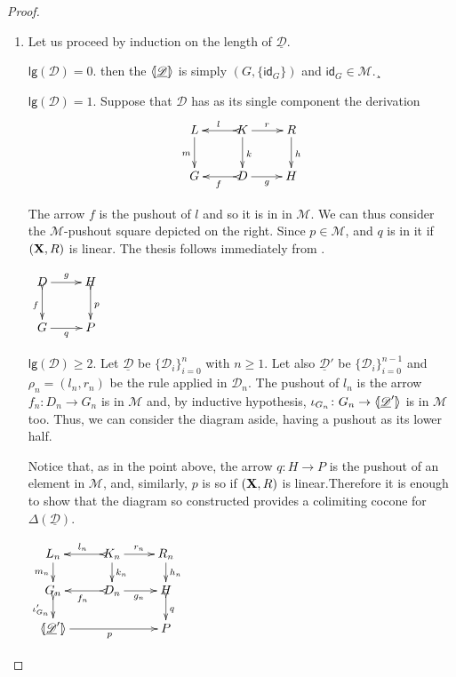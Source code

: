 \documentclass[a4paper,UKenglish,cleveref,pdftex,thm-restate,numberwithinsect]{lipics-v2021}
\newcommand{\id}[1]{\mathsf{id}_{#1}}
\def\R{\mathsf{R}}
\def\X{\textbf {\textup{X}}}
\def\G{\textbf {\textup{G}}}
\newcommand{\dder}[1]{\mathscr{#1}}
\newcommand{\der}[1]{\underline{\dder{#1}}}
\newcommand{\lpro}{\langle \hspace{-1.85pt}[}
\newcommand{\rpro}{]\hspace{-1.85pt}\rangle}
\newcommand{\tpro}[1]{\lpro \der{#1}\rpro}
\newcommand{\lgh}[0]{\mathsf{lg}}
\begin{document}
\begin{proof}
	\begin{enumerate}
		\item Let us proceed by induction on the length of $\der{D}$.
		
		
		\smallskip \noindent
		$\lgh(\dder{D})=0$. then the
		$\tpro{\dder{D}}$ is simply $(G, \{\id{G}\})$ and
		$\id{G}\in \mathcal{M}$.¸
		
		\smallskip \noindent
		$\lgh(\dder{D})=1$. Suppose that $\dder{D}$
		has as its single component the derivation
		\[\xymatrix{L \ar[d]_{m}& K \ar[d]^{k}\ar@{>->}[l]_{l} \ar[r]^{r} & R \ar[d]^{h} \\G& \ar@{>->}[l]^{f} D \ar[r]_{g}& H  \\}\]
	
		\parbox{11cm}{The arrow $f$ is  the pushout of $l$ and so it is in in $\mathcal{M}$. We can thus consider the $\mathcal{M}$-pushout square depicted on the right.
		Since $p\in \mathcal{M}$, and $q$ is in it if $(\X, \R)$ is linear. The thesis follows immediately from .}
		\parbox{2cm}{
			$\xymatrix{D \ar@{>->}[d]_{f} \ar[r]^{g} & H \ar@{>->}[d]^{p} \\G \ar[r]_{q}& P }$}
		
		\smallskip \noindent
	\parbox{9cm}{$\lgh(\dder{D})\geq 2$. Let $\der{D}$ be
		$\{\dder{D}_i\}_{i=0}^n$ with $n\geq 1$. Let also $\der{D}'$ be
		$\{\dder{D}_i\}^{n-1}_{i=0}$ and $\rho_n=(l_n, r_n)$ be the rule
		applied in $\dder{D}_n$. The pushout of $l_n$ is the arrow
		$f_n\colon D_n\to G_n$ is in $\mathcal{M}$ and, by inductive
		hypothesis, $\iota_{G_{n}}\colon G_{n}\to \lpro \der{D}'\rpro$ is
		in $\mathcal{M}$ too. Thus, we can consider the diagram aside,
		having a pushout as its lower half.

\smallskip \noindent 
\parbox{13.45cm} {\hspace{15pt}
		Notice that, as in the point above, the arrow $q\colon H\to P$ is the pushout of an element in $\mathcal{M}$, and, similarly, $p$ is so if $(\X, \R)$ is linear.Therefore it is enough to show that the diagram so constructed provides a colimiting cocone for $\Delta(\der{D})$.}}
		\parbox{4cm}{\vspace{-1.5cm}$\xymatrix@R=15pt{L_n \ar[d]_{m_{n}}& K_{n} \ar[d]^{k_{n}}\ar@{>->}[l]_{l_{n}} \ar[r]^{r_{n}} & R_{n} \ar[d]^{h_n} \\G_{n} \ar@{>->}[d]_{\iota'_{G_{n}}}& \ar@{>->}[l]^{f_n} D_n \ar[r]_{g_n}& H  \ar@{>->}[d]^{q}\\ \lpro \der{D}' \ar[rr]_{p}\rpro && P}$}
		

\end{enumerate}
\end{proof}
\end{document}
